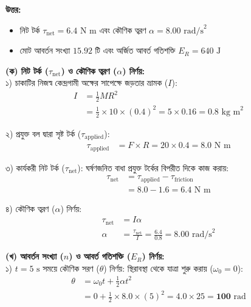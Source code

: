 \documentclass[12pt, a4paper]{article}
\begin{document}
\begin{tcolorbox}[answerbox]
\textbf{\color{success} উত্তর:} 
\begin{itemize}
    \item[(ক)] নিট টর্ক $\tau_{\text{net}} = 6.4\text{ N m}$ এবং কৌণিক ত্বরণ $\alpha = 8.00\text{ rad/s}^2$
    \item[(খ)] মোট আবর্তন সংখ্যা $15.92$ টি এবং অর্জিত আবর্ত গতিশক্তি $E_R = 640\text{ J}$
\end{itemize}
\end{tcolorbox}
\vspace{1em}

\begin{tcolorbox}[solutionbox={সমাধান (Solution)}]
\noindent
\textbf{(ক) নিট টর্ক ($\tau_{\text{net}}$) ও কৌণিক ত্বরণ ($\alpha$) নির্ণয়:} \\
১) চাকাটির নিজস্ব কেন্দ্রগামী অক্ষের সাপেক্ষে জড়তার ভ্রামক ($I$):
\begin{align*}
    I &= \frac{1}{2} M R^2 \\
      &= \frac{1}{2} \times 10 \times (0.4)^2 = 5 \times 0.16 = \mathbf{0.8}\text{ kg m}^2
\end{align*}

২) প্রযুক্ত বল দ্বারা সৃষ্ট টর্ক ($\tau_{\text{applied}}$):
\begin{align*}
    \tau_{\text{applied}} &= F \times R = 20 \times 0.4 = \mathbf{8.0}\text{ N m}
\end{align*}

৩) কার্যকরী নিট টর্ক ($\tau_{\text{net}}$): ঘর্ষণজনিত বাধা প্রযুক্ত টর্কের বিপরীত দিকে কাজ করায়:
\begin{align*}
    \tau_{\text{net}} &= \tau_{\text{applied}} - \tau_{\text{friction}} \\
                      &= 8.0 - 1.6 = \mathbf{6.4}\text{ N m}
\end{align*}

৪) কৌণিক ত্বরণ ($\alpha$) নির্ণয়:
\begin{align*}
    \tau_{\text{net}} &= I \alpha \\
    \alpha &= \frac{\tau_{\text{net}}}{I} = \frac{6.4}{0.8} = \mathbf{8.00}\text{ rad/s}^2
\end{align*}

\vspace{0.5em}
\noindent\textbf{(খ) আবর্তন সংখ্যা ($n$) ও আবর্ত গতিশক্তি ($E_R$) নির্ণয়:} \\
১) $t = 5\text{ s}$ সময়ে কৌণিক সরণ ($\theta$) নির্ণয়: স্থিরাবস্থা থেকে যাত্রা শুরু করায় ($\omega_0 = 0$):
\begin{align*}
    \theta &= \omega_0 t + \frac{1}{2} \alpha t^2 \\
           &= 0 + \frac{1}{2} \times 8.0 \times (5)^2 = 4.0 \times 25 = \mathbf{100}\text{ rad}
\end{align*}


\end{tcolorbox}
\end{document}
